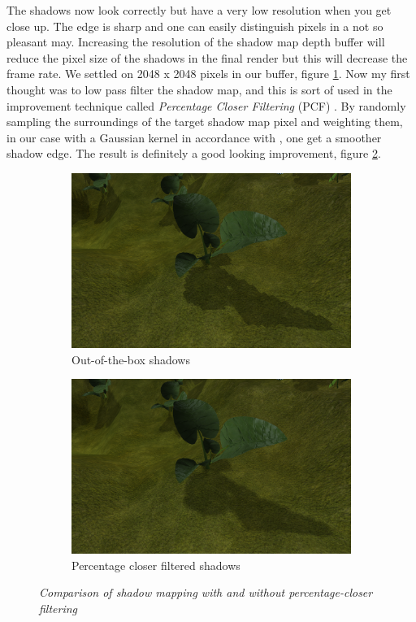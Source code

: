 The shadows now look correctly but have a very low resolution when you get close up. The edge is sharp and one can easily distinguish pixels in a not so pleasant may. Increasing the resolution of the shadow map depth buffer will reduce the pixel size of the shadows in the final render but this will decrease the frame rate. We settled on 2048 x 2048 pixels in our buffer, figure \ref{fig:PCFLvl1}. Now my first thought was to low pass filter the shadow map, and this is sort of used in the improvement technique called \textit{Percentage Closer Filtering} (PCF) \cite{ShadowMapAntialiasing87}\cite{ShadowMapAntialiasing03}. By randomly sampling the surroundings of the target shadow map pixel and weighting them, in our case with a Gaussian kernel in accordance with \cite{CascadeShadowMapping}, one get a smoother shadow edge. The result is definitely a good looking improvement, figure \ref{fig:PCFLvl5}. 

\begin{figure}[H]
\begin{subfigure}{.5\textwidth}
  \centering
  \includegraphics[width=0.9\linewidth]{images/PCFLvl1.png}
  \caption{Out-of-the-box shadows}
  \label{fig:PCFLvl1}
\end{subfigure}%
\begin{subfigure}{.5\textwidth}
  \centering
  \includegraphics[width=0.9\linewidth]{images/PCFLvl5.png}
  \caption{Percentage closer filtered shadows}
  \label{fig:PCFLvl5}
\end{subfigure}
\caption[Noise comparison]{\textit{Comparison of shadow mapping with and without percentage-closer filtering}}
\label{fig:PCFComparison}
\end{figure}

